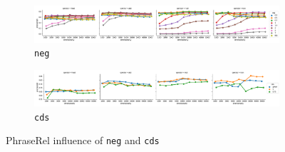 \begin{figure}
  \centering

  \begin{subfigure}[t]{\textwidth}
    \includegraphics[width=1.1\textwidth]{supplement/figures/phraserel-interaction-neg}

  \caption{\texttt{neg}}
  \label{fig:phraserel-neg}
  \end{subfigure}

  \begin{subfigure}[t]{\textwidth}
    \includegraphics[width=1.1\textwidth]{supplement/figures/phraserel-interaction-cds}

  \caption{\texttt{cds}}
  \label{fig:phraserel-cds}
  \end{subfigure}

  \caption{PhraseRel influence of \texttt{neg} and \texttt{cds}}
\end{figure}
